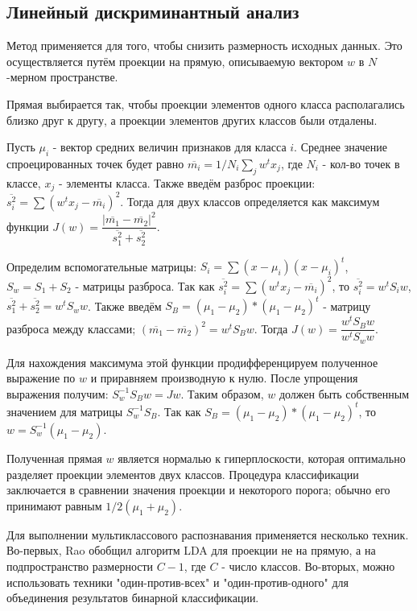 
\subsection{Линейный дискриминантный анализ}

Метод  применяется для того, чтобы снизить размерность исходных данных. Это осуществляется путём проекции на прямую, описываемую вектором $w$ в $N$-мерном пространстве. 

Прямая выбирается так, чтобы проекции элементов одного класса располагались близко друг к другу, а проекции элементов других классов были отдалены. 


Пусть $\mu_i$ - вектор средних величин признаков для класса $i$. Среднее значение спроецированных точек будет равно $\overline{m_i}=1/N_i\sum_j w^tx_j$, где $N_i$ - кол-во точек в классе, $x_j$ - элементы класса. Также введём разброс проекции: $\overline{s_i^2}=\sum (w^tx_j-\overline{m_i})^2$. Тогда  для двух классов определяется как максимум функции $J(w)=\dfrac{|\overline{m_1}-\overline{m_2}|^2}{\overline{s_1^2}+\overline{s_2^2}}$.

Определим вспомогательные матрицы: $S_i=\sum(x-\mu_i)(x-\mu_i)^t$, $S_w=S_1+S_2$ - матрицы разброса. Так как $\overline{s_i^2}=\sum (w^tx_j-\overline{m_i})^2$, то $\overline{s_i^2}=w^tS_iw$, $\overline{s_1^2}+\overline{s_2^2}=w^tS_ww$. Также введём $S_B=(\mu_1-\mu_2)*(\mu_1-\mu_2)^t$ - матрицу разброса между классами; $(\overline{m_1}-\overline{m_2})^2=w^tS_Bw$. Тогда $J(w)=\dfrac{w^tS_Bw}{w^tS_ww}$. 

Для нахождения максимума этой функции продифференцируем полученное выражение по $w$ и приравняем производную к нулю. После упрощения выражения получим: $S_w^{-1}S_Bw=Jw$. Таким образом, $w$ должен быть собственным значением для матрицы $S_w^{-1}S_B$. Так как $S_B=(\mu_1-\mu_2)*(\mu_1-\mu_2)^t$, то $w=S_w^{-1}(\mu_1-\mu_2)$. 

Полученная прямая $w$ является нормалью к гиперплоскости, которая оптимально разделяет проекции элементов двух классов. Процедура классификации заключается в сравнении значения проекции и некоторого порога; обычно его принимают равным $1/2(\mu_1+\mu_2)$.

Для выполнении мультиклассового распознавания применяется несколько техник. Во-первых, Rao обобщил алгоритм LDA для проекции не на прямую, а на подпространство размерности $C-1$, где $C$ - число классов. Во-вторых, можно использовать техники "один-против-всех" и "один-против-одного" для объединения результатов бинарной классификации.


